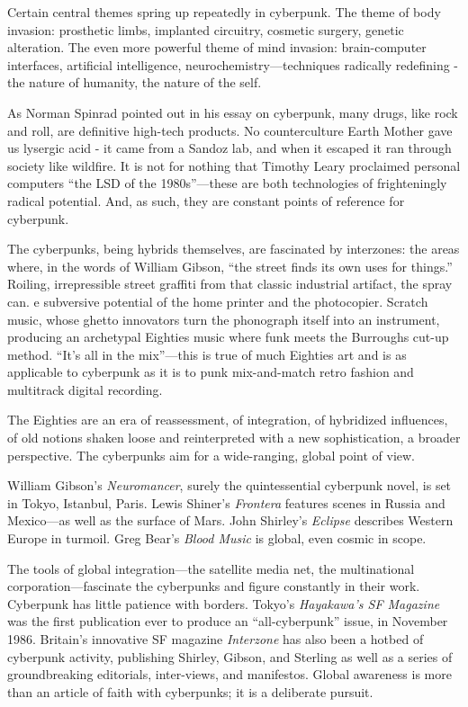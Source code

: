 Certain central themes spring up repeatedly in cyberpunk. The theme of body invasion: prosthetic limbs, implanted circuitry, cosmetic surgery, genetic alteration. The even more powerful theme of mind invasion: brain-computer interfaces, artificial intelligence, neurochemistry---techniques radically redefining - the nature of humanity, the nature of the self.

As Norman Spinrad pointed out in his essay on cyberpunk, many drugs, like rock and roll, are definitive high-tech products. No counterculture Earth Mother gave us lysergic acid - it came from a Sandoz lab, and when it escaped it ran through society like wildfire. It is not for nothing that Timothy Leary proclaimed personal computers ``the LSD of the 1980s''---these are both technologies of frighteningly radical potential. And, as such, they are constant points of reference for cyberpunk.

The cyberpunks, being hybrids themselves, are fascinated by interzones: the areas where, in the words of William Gibson, ``the street finds its own uses for things.'' Roiling, irrepressible street graffiti from that classic industrial artifact, the spray can. e subversive potential of the home printer and the photocopier. Scratch music, whose ghetto innovators turn the phonograph itself into an instrument, producing an archetypal Eighties music where funk meets the Burroughs cut-up method. ``It's all in the mix''---this is true of much Eighties art and is as applicable to cyberpunk as it is to punk mix-and-match retro fashion and multitrack digital recording.

The Eighties are an era of reassessment, of integration, of hybridized influences, of old notions shaken loose and reinterpreted with a new sophistication, a broader perspective. The cyberpunks aim for a wide-ranging, global point of view.

William Gibson's \textit{Neuromancer}, surely the quintessential cyberpunk novel, is set in Tokyo, Istanbul, Paris. Lewis Shiner's \textit{Frontera} features scenes in Russia and Mexico---as well as the surface of Mars. John Shirley's \textit{Eclipse} describes Western Europe in turmoil. Greg Bear's \textit{Blood Music} is global, even cosmic in scope.

The tools of global integration---the satellite media net, the multinational corporation---fascinate the cyberpunks and figure constantly in their work. Cyberpunk has little patience with borders. Tokyo's \textit{Hayakawa's SF Magazine} was the first publication ever to produce an ``all-cyberpunk'' issue, in November 1986. Britain's innovative SF magazine \textit{Interzone} has also been a hotbed of cyberpunk activity, publishing Shirley, Gibson, and Sterling as well as a series of groundbreaking editorials, inter-views, and manifestos. Global awareness is more than an article of faith with cyberpunks; it is a deliberate pursuit.

